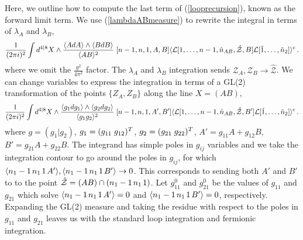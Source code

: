 \documentclass[12pt]{article}
\numberwithin{equation}{section}
\begin{document}
Here, we outline how to compute the last term of (\ref{looprecursion}), known as the forward limit term. We use (\ref{lambdaABmeasure}) to rewrite the integral in terms of $\lambda_A$ and $\lambda_B$,
\begin{align}
\frac{1}{(2 \pi i)^2} \int d^{4|8}X \wedge \frac{\langle A dA\rangle\wedge \langle B dB \rangle}{\langle A B \rangle^2}\hspace{1mm} [n-1,n,1,A,B] \langle \mathcal{L}[1,\ldots,n-1,\hat{n}_{AB},\hat{\mathcal{Z}},B] \mathcal{L}[\tilde{1},\ldots,\tilde{n}_2]\rangle^{\rm c} \, .
\end{align}
where we omit the $\frac{g^2}{4\pi^2}$ factor. The $\lambda_A$ and $\lambda_B$ integration sends $\mathcal{Z}_A,\mathcal{Z}_B\rightarrow \hat{\mathcal{Z}}$. We can change variables to express the integration in terms of a GL(2) transformation of the points $\{Z_A,Z_B\}$ along the line $X=(AB)$,
\begin{align}
\frac{1}{(2 \pi i)^2} \int d^{4|8}X \wedge \frac{\langle g_1 dg_1\rangle \wedge \langle g_2 dg_2 \rangle}{\langle g_1 g_2 \rangle^2}\hspace{1mm} [n-1,n,1,A',B'] \langle \mathcal{L}[1,\ldots,n-1,\hat{n}_{AB},\hat{\mathcal{Z}},B'] \mathcal{L}[\tilde{1},\ldots,\tilde{n}_2]\rangle^{\rm c} \, .
\end{align}
where $g=(g_1 | g_2)$, $g_1=(g_{11} \hspace{1mm} g_{12})^T$, $g_2=(g_{21} \hspace{1mm} g_{22})^T$, $A'=g_{11}A+g_{12}B$, $B'= g_{21}A+g_{22}B$. The integrand has simple poles in $g_{ij}$ variables and we take the integration contour to go around the poles in $g_{ij}$, for which $\langle n_1-1\hspace{0.5mm} n_1 \hspace{0.5mm}1 \hspace{0.5mm}A'\rangle,\langle n_1-1\hspace{0.5mm} n_1 \hspace{0.5mm}1 \hspace{0.5mm}B'\rangle\rightarrow 0$. This corresponds to sending both $A'$ and $B'$ to to the point $\hat{\mathcal{Z}}=(A B)\cap(n_1-1\hspace{0.5mm} n_1\hspace{0.5mm} 1)$. Let $g_{11}^0$ and $g_{21}^0$ be the values of $g_{11}$ and $g_{21}$ which solve $\langle n_1-1 \hspace{0.5mm}n_1 \hspace{0.5mm} 1 \hspace{0.5mm} A'\rangle=0$ and $\langle n_1-1 \hspace{0.5mm}n_1 \hspace{0.5mm} 1 \hspace{0.5mm} B'\rangle=0$, respectively. Expanding the GL(2) measure and taking the residue with respect to the poles in $g_{11}$ and $g_{21}$ leaves us with the standard loop integration and fermionic integration.
\end{document}
